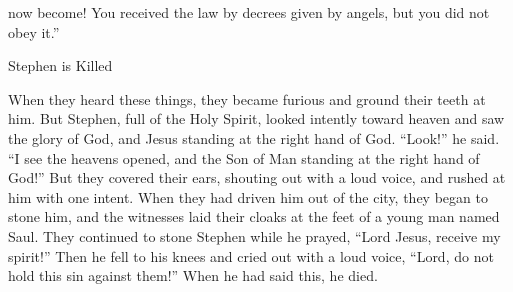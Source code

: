 {now
become!
You
received
the law
by
decrees given by
angels,
but
you did
not
obey it.”
\par }{\SH Stephen is Killed
\par }{\PP {}When they heard
these things,
they
became furious
and
ground
their teeth
at
him.
But
Stephen, full
of the Holy
Spirit,
looked intently
toward
heaven
and saw
the glory
of God,
and
Jesus
standing
at
the right hand
of God.
“Look!” he said. “I see
the heavens
opened,
and
the Son
of Man
standing
at
the right hand
of God!”
But
they covered
their
ears,
shouting out
with a
loud
voice,
and
rushed
at
him
with one intent.
When
they had driven
him out
of the city,
they began to stone
him, and
the witnesses
laid
their
cloaks
at
the feet
of a young man
named
Saul.
They continued to stone
Stephen
while
he prayed,
“Lord
Jesus,
receive
my
spirit!”
Then
he fell
to his knees
and cried out
with a
loud
voice,
“Lord,
do
not
hold
this
sin
against them!” When
he had said
this,
he died.

}
